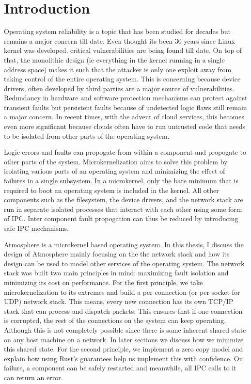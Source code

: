 
\chapter{Introduction} %

\label{Chapter1} %


Operating system reliability is a topic that has been studied for decades but remains a major concern till date. Even thought its been 30 years since Linux kernel was developed, critical vulnerabilities are being found till date. On top of that, the monolithic design (ie everything in the kernel running in a single address space) makes it such that the attacker is only one exploit away from taking control of the entire operating system. This is concerning because device drivers, often developed by third parties are a major source of vulnerabilities. Redundancy in hardware and software protection mechanisms can protect against transient faults but persistent faults because of undetected logic flaws still remain a major concern. In recent times, with the advent of cloud services, this becomes even more significant because clouds often have to run untrusted code that needs to be isolated from other parts of the operating system.

Logic errors and faults can propogate from within a component and propogate to other parts of the system. Microkernelization aims to solve this problem by isolating various parts of an operating system and minimizing the effect of failures in a single subsystem. In a microkernel, only the bare minimum that is required to boot an operating system is included in the kernel. All other components such as the filesystem, the device drivers, and the network stack are run in separate isolated processes that interact with each other using some form of IPC. Inter component fault propogation can thus be reduced by introducing safe IPC mechanisms.

Atmosphere is a microkernel based operating system. In this thesis, I discuss the design of Atmosphere mainly focusing on the the network stack and how its design can be used to model other services of the operating system. The network stack was built two main principles in mind: maximizing fault isolation and minimizing its cost on performance. For the first principle, we take microkernelization to its extremes and build a per connection (or per socket for UDP) network stack. This means, every new connection has its own TCP/IP stack that can process and dispatch packets. This ensures that if one connection is corrupted, the rest of the connections on the system can keep operating. Although this is not completely possible since there is some inherent shared state on any host machine on a network. In later sections we discuss how we minimize this shared state. For the second principle, we implement a zero copy model and explain how using Rust's guarantees help us implement this with confidence. On failure, a component can be safely restarted and meanwhile, all IPC calls to it can return an error. 


